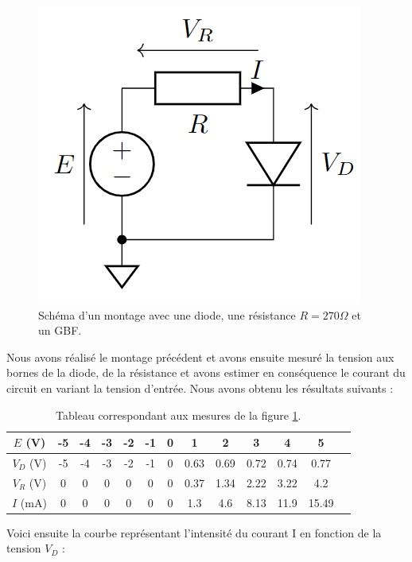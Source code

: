 \begin{figure}[H]
    \begin{center}
        \includegraphics*[scale=0.5]{images/1.png}
        \caption{\label{figure 1} Schéma d'un montage avec une diode, une résistance $R=270 \Omega$ et un GBF.}
    \end{center}
\end{figure}

Nous avons réalisé le montage précédent et avons ensuite mesuré la tension aux bornes de la diode, de la résistance et avons estimer en conséquence le courant du circuit en variant la tension d'entrée. Nous avons obtenu les résultats suivants :

\begin{table}[H]
    \centering
    \begin{tabular}{|c|c|c|c|c|c|c|c|c|c|c|c|c|}
        \hline
        $E$ (V) & -5 & -4 & -3 & -2 & -1 & 0 & 1 & 2 & 3 & 4 & 5\\
        \hline
        $V_D$ (V) & -5 & -4 & -3 & -2 & -1 & 0 & 0.63 & 0.69 & 0.72 & 0.74 & 0.77\\
        \hline
        $V_R$ (V)& 0 & 0 & 0 & 0 & 0 & 0 & 0.37 & 1.34 & 2.22 & 3.22 & 4.2\\
        \hline
        $I$ (mA) & 0 & 0 & 0 & 0 & 0 & 0 & 1.3 & 4.6 & 8.13 & 11.9 & 15.49\\
        \hline
    \end{tabular}
    \caption{\label{table 1} Tableau correspondant aux mesures de la figure \ref{figure 1}.}
\end{table}

\newpage
Voici ensuite la courbe représentant l'intensité du courant I en fonction de la tension $V_D$ : 

